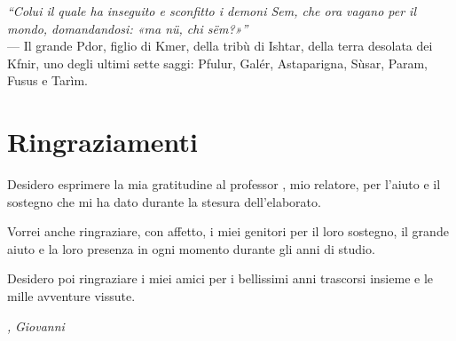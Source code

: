\cleardoublepage
{}
{}

\begin{flushright}{
    \slshape
    ``Colui il quale ha inseguito e sconfitto i demoni Sem, che ora vagano per il mondo, domandandosi: «ma nü, chi sëm?»''} \\
    \medskip
    --- Il grande Pdor, figlio di Kmer, della tribù di Ishtar, della terra desolata dei Kfnir, uno degli ultimi sette saggi: Pfulur, Galér, Astaparigna, Sùsar, Param, Fusus e Tarìm.
\end{flushright}


\bigskip

\begingroup
\let\clearpage\relax
\let\cleardoublepage\relax
\let\cleardoublepage\relax

\chapter*{Ringraziamenti}

\noindent Desidero esprimere la mia gratitudine al professor \myProf, mio relatore, per l'aiuto e il sostegno che mi ha dato durante la stesura dell'elaborato.

\noindent Vorrei anche ringraziare, con affetto, i miei genitori per il loro sostegno, il grande aiuto e la loro presenza in ogni momento durante gli anni di studio.

\noindent Desidero poi ringraziare i miei amici per i bellissimi anni trascorsi insieme e le mille avventure vissute.
\bigskip

\noindent\textit{\myLocation, \myTime}
\hfill \textit{Giovanni} %

\endgroup
